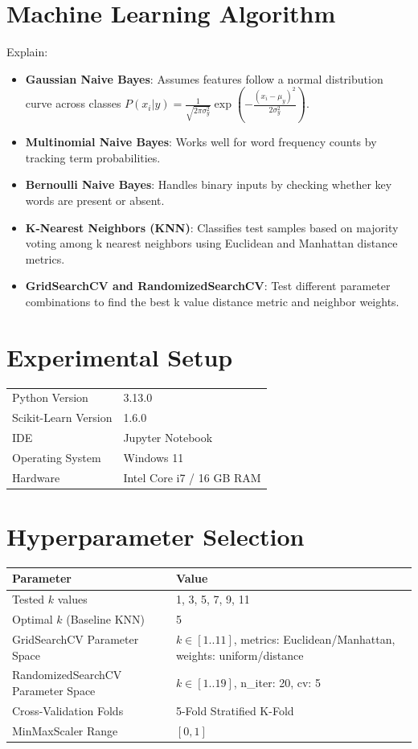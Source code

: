 \documentclass[12pt,a4paper]{article}
\begin{document}
\section{Machine Learning Algorithm}

Explain:
\begin{itemize}
\item \textbf{Gaussian Naive Bayes}: Assumes features follow a normal distribution curve across classes $P(x_i|y) = \frac{1}{\sqrt{2\pi\sigma_y^2}} \exp\left(-\frac{(x_i-\mu_y)^2}{2\sigma_y^2}\right)$.
\item \textbf{Multinomial Naive Bayes}: Works well for word frequency counts by tracking term probabilities.
\item \textbf{Bernoulli Naive Bayes}: Handles binary inputs by checking whether key words are present or absent.
\item \textbf{K-Nearest Neighbors (KNN)}: Classifies test samples based on majority voting among k nearest neighbors using Euclidean and Manhattan distance metrics.
\item \textbf{GridSearchCV and RandomizedSearchCV}: Test different parameter combinations to find the best k value distance metric and neighbor weights.
\end{itemize}

\section{Experimental Setup}

\begin{tabular}{ll}
\toprule
Python Version & 3.13.0 \\
Scikit-Learn Version & 1.6.0 \\
IDE & Jupyter Notebook \\
Operating System & Windows 11 \\
Hardware & Intel Core i7 / 16 GB RAM \\
\bottomrule
\end{tabular}

\section{Hyperparameter Selection}

\begin{tabular}{ll}
\toprule
Parameter & Value\\
\midrule
Tested $k$ values & 1, 3, 5, 7, 9, 11 \\
Optimal $k$ (Baseline KNN) & 5 \\
GridSearchCV Parameter Space & $k \in [1..11]$, metrics: Euclidean/Manhattan, weights: uniform/distance \\
RandomizedSearchCV Parameter Space & $k \in [1..19]$, n\_iter: 20, cv: 5 \\
Cross-Validation Folds & 5-Fold Stratified K-Fold \\
MinMaxScaler Range & $[0, 1]$ \\
\bottomrule
\end{tabular}
\end{document}
